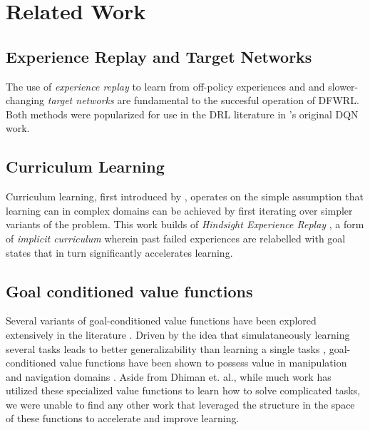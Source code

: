 \section{Related Work}

\subsection{Experience Replay and Target Networks}
The use of \emph{experience replay} to learn from off-policy experiences
and and slower-changing \emph{target
networks} are fundamental to the succesful operation of DFWRL. Both
methods were popularized for use in the DRL literature in
\citet{mnih2015human}'s original DQN work. 

\subsection{Curriculum Learning}
Curriculum learning, first introduced by \citet{bengio2009curriculum},
operates on the simple assumption that learning can in complex domains
can be achieved by first iterating over simpler variants of the problem.
This work builds of \emph{Hindsight Experience Replay}
\citep{andrychowicz2017hindsight}, a form of \emph{implicit curriculum}
wherein past failed experiences are relabelled with goal states that in
turn significantly accelerates learning. 


\subsection{Goal conditioned value functions}
Several variants of goal-conditioned value functions have been explored
extensively in the literature
\citep{sutton2011horde,schaul2015universal}.  Driven by the idea that
simulataneously learning several tasks leads to better generalizability
than learning a single tasks \citep{pong2018temporal}, goal-conditioned
value functions have been shown to possess value in manipulation
\citep{plappert2018multi,peng2018sim} and navigation domains
\citep{zhang2017deep,mirowski2018learning}. Aside from Dhiman et. al.,
while much work has utilized these specialized value functions to learn
how to solve complicated tasks, we were unable to find any other work
that leveraged the structure in the space of these functions to
accelerate and improve learning. 


